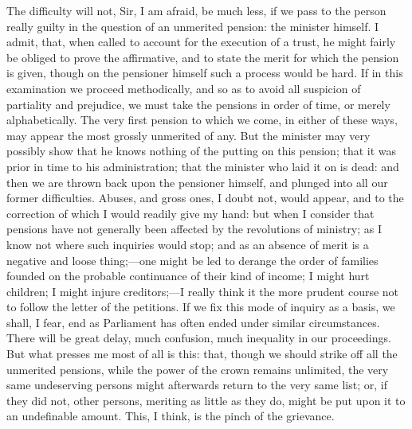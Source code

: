 The difficulty will not, Sir, I am afraid, be much less, if we pass to the person really guilty in the question of an unmerited pension: the minister himself. I admit, that, when called to account for the execution of a trust, he might fairly be obliged to prove the affirmative, and to state the merit for which the pension is given, though on the pensioner himself such a process would be hard. If in this examination we proceed methodically, and so as to avoid all suspicion of partiality and prejudice, we must take the pensions in order of time, or merely alphabetically. The very first pension to which we come, in either of these ways, may appear the most grossly unmerited of any. But the minister may very possibly show that he knows nothing of the putting on this pension; that it was prior in time to his administration; that the minister who laid it on is dead: and then we are thrown back upon the pensioner himself, and plunged into all our former difficulties. Abuses, and gross ones, I doubt not, would appear, and to the correction of which I would readily give my hand: but when I consider that pensions have not generally been affected by the revolutions of ministry; as I know not where such inquiries would stop; and as an absence of merit is a negative and loose thing;—one might be led to derange the order of families founded on the probable continuance of their kind of income; I might hurt children; I might injure creditors;—I really think it the more prudent course not to follow the letter of the petitions. If we fix this mode of inquiry as a basis, we shall, I fear, end as Parliament has often ended under similar circumstances. There will be great delay, much confusion, much inequality in our proceedings. But what presses me most of all is this: that, though we should strike off all the unmerited pensions, while the power of the crown remains unlimited, the very same undeserving persons might afterwards return to the very same list; or, if they did not, other persons, meriting as little as they do, might be put upon it to an undefinable amount. This, I think, is the pinch of the grievance.

